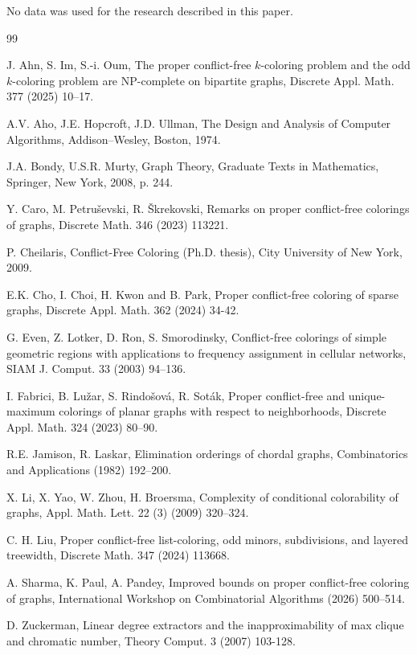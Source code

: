 \documentclass[11pt]{article}
\theoremstyle{plain}
\begin{document}
No data was used for the research described in this paper.
\begin{thebibliography}{99}
	
	J. Ahn, S. Im, S.-i. Oum, 
	The proper conflict-free $k$-coloring problem and the odd $k$-coloring problem are NP-complete on bipartite graphs, 
	Discrete Appl. Math. 377 (2025) 10--17.
	
	A.V. Aho, J.E. Hopcroft, J.D. Ullman,
	The Design and Analysis of Computer Algorithms,
	Addison--Wesley, Boston, 1974.
	
	J.A. Bondy, U.S.R. Murty,
	Graph Theory,
	Graduate Texts in Mathematics, Springer, New York, 2008, p. 244.
	
	Y. Caro, M. Petruševski, R. Škrekovski,
	Remarks on proper conflict-free colorings of graphs,
	Discrete Math. 346 (2023) 113221.
	
	 P. Cheilaris, Conflict-Free Coloring (Ph.D. thesis), City University of New York, 2009.
	
	E.K. Cho, I. Choi, H. Kwon and B. Park,
	Proper conflict-free coloring of sparse graphs,
	Discrete Appl. Math. 362 (2024) 34-42.
	
	
	 G. Even, Z. Lotker, D. Ron, S. Smorodinsky, Conflict-free colorings of simple geometric regions with applications to frequency assignment in cellular networks, SIAM J. Comput. 33 (2003) 94–136.
	
	I. Fabrici, B. Lužar, S. Rindošová, R. Soták, 
	Proper conflict-free and unique-maximum colorings of planar graphs with respect to neighborhoods, 
	Discrete Appl. Math. 324 (2023) 80--90.
	
	
	R.E. Jamison, R. Laskar, 
	Elimination orderings of chordal graphs, 
	Combinatorics and Applications (1982) 192--200.
	

	
	X. Li, X. Yao, W. Zhou, H. Broersma, 
	Complexity of conditional colorability of graphs, 
	Appl. Math. Lett. 22 (3) (2009) 320--324.
	
	
	 C. H. Liu, Proper conflict-free list-coloring, odd minors, subdivisions, and layered treewidth, Discrete Math. 347 (2024) 113668.
	
	
	
	A. Sharma, K. Paul, A. Pandey,
	Improved bounds on proper conflict-free coloring of graphs,
	International Workshop on Combinatorial Algorithms (2026) 500--514.
	
	
	D. Zuckerman,
	Linear degree extractors and the inapproximability of max clique and chromatic number,
	Theory Comput. 3 (2007) 103-128.
	
\end{thebibliography}
\end{document}
